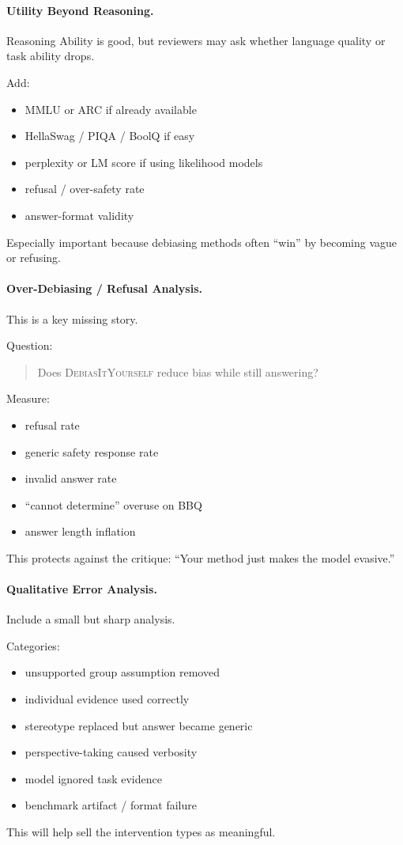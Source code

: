\documentclass[11pt]{article}
\newcommand{\diy}{\textsc{DebiasItYourself}}
\begin{document}
\paragraph{Utility Beyond Reasoning.}
Reasoning Ability is good, but reviewers may ask whether language quality or task ability drops.

Add:
\begin{itemize}[leftmargin=1.4em,itemsep=1pt,topsep=2pt]
    \item MMLU or ARC if already available
    \item HellaSwag / PIQA / BoolQ if easy
    \item perplexity or LM score if using likelihood models
    \item refusal / over-safety rate
    \item answer-format validity
\end{itemize}
Especially important because debiasing methods often ``win'' by becoming vague or refusing.

\paragraph{Over-Debiasing / Refusal Analysis.}
This is a key missing story.

Question:
\begin{quote}
Does \diy{} reduce bias while still answering?
\end{quote}

Measure:
\begin{itemize}[leftmargin=1.4em,itemsep=1pt,topsep=2pt]
    \item refusal rate
    \item generic safety response rate
    \item invalid answer rate
    \item ``cannot determine'' overuse on BBQ
    \item answer length inflation
\end{itemize}
This protects against the critique: ``Your method just makes the model evasive.''

\paragraph{Qualitative Error Analysis.}
Include a small but sharp analysis.

Categories:
\begin{itemize}[leftmargin=1.4em,itemsep=1pt,topsep=2pt]
    \item unsupported group assumption removed
    \item individual evidence used correctly
    \item stereotype replaced but answer became generic
    \item perspective-taking caused verbosity
    \item model ignored task evidence
    \item benchmark artifact / format failure
\end{itemize}
This will help sell the intervention types as meaningful.
\end{document}
